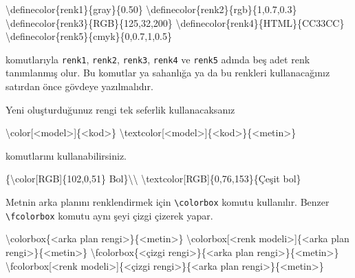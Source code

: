 \documentclass[
  letterpaper,
  DIV=11,
  numbers=noendperiod]{scrreprt}
\newenvironment{Shaded}{\begin{snugshade}}{\end{snugshade}}
\newcommand{\FunctionTok}[1]{\textcolor[rgb]{0.28,0.35,0.67}{#1}}
\newcommand{\NormalTok}[1]{\textcolor[rgb]{0.00,0.23,0.31}{#1}}
\begin{document}
\begin{Shaded}
\begin{Highlighting}[]
\FunctionTok{\textbackslash{}definecolor}\NormalTok{\{renk1\}\{gray\}\{0.50\}}
\FunctionTok{\textbackslash{}definecolor}\NormalTok{\{renk2\}\{rgb\}\{1,0.7,0.3\}}
\FunctionTok{\textbackslash{}definecolor}\NormalTok{\{renk3\}\{RGB\}\{125,32,200\}}
\FunctionTok{\textbackslash{}definecolor}\NormalTok{\{renk4\}\{HTML\}\{CC33CC\}}
\FunctionTok{\textbackslash{}definecolor}\NormalTok{\{renk5\}\{cmyk\}\{0,0.7,1,0.5\}}
\end{Highlighting}
\end{Shaded}

komutlarıyla \texttt{renk1}, \texttt{renk2}, \texttt{renk3},
\texttt{renk4} ve \texttt{renk5} adında beş adet renk tanımlanmış olur.
Bu komutlar ya sahanlığa ya da bu renkleri kullanacağınız satırdan önce
gövdeye yazılmalıdır.

Yeni oluşturduğunuz rengi tek seferlik kullanacaksanız

\begin{Shaded}
\begin{Highlighting}[]
\FunctionTok{\textbackslash{}color}\NormalTok{[\textless{}model\textgreater{}]\{\textless{}kod\textgreater{}\}}
\FunctionTok{\textbackslash{}textcolor}\NormalTok{[\textless{}model\textgreater{}]\{\textless{}kod\textgreater{}\}\{\textless{}metin\textgreater{}\}}
\end{Highlighting}
\end{Shaded}

komutlarını kullanabilirsiniz.

\begin{Shaded}
\begin{Highlighting}[]
\NormalTok{\{}\FunctionTok{\textbackslash{}color}\NormalTok{[RGB]\{102,0,51\} Bol\}}\FunctionTok{\textbackslash{}\textbackslash{}}
\FunctionTok{\textbackslash{}textcolor}\NormalTok{[RGB]\{0,76,153\}\{Çeşit bol\}}
\end{Highlighting}
\end{Shaded}

Metnin arka planını renklendirmek için \texttt{\textbackslash{}colorbox}
komutu kullanılır. Benzer \texttt{\textbackslash{}fcolorbox} komutu aynı
şeyi çizgi çizerek yapar.

\begin{Shaded}
\begin{Highlighting}[]
\FunctionTok{\textbackslash{}colorbox}\NormalTok{\{\textless{}arka plan rengi\textgreater{}\}\{\textless{}metin\textgreater{}\}}
\FunctionTok{\textbackslash{}colorbox}\NormalTok{[\textless{}renk modeli\textgreater{}]\{\textless{}arka plan rengi\textgreater{}\}\{\textless{}metin\textgreater{}\}}
\FunctionTok{\textbackslash{}fcolorbox}\NormalTok{\{\textless{}çizgi rengi\textgreater{}\}\{\textless{}arka plan rengi\textgreater{}\}\{\textless{}metin\textgreater{}\}}
\FunctionTok{\textbackslash{}fcolorbox}\NormalTok{[\textless{}renk modeli\textgreater{}]\{\textless{}çizgi rengi\textgreater{}\}\{\textless{}arka plan rengi\textgreater{}\}\{\textless{}metin\textgreater{}\}}
\end{Highlighting}
\end{Shaded}
\end{document}
